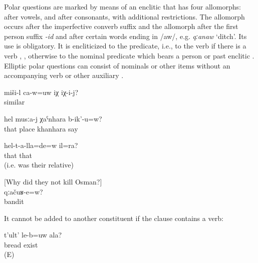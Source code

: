 Polar questions are marked by means of an enclitic that has four allomorphs:  after vowels, and  after consonants, with additional restrictions. The allomorph  occurs after the imperfective converb suffix  and the allomorph  after the first person suffix \textit{-id} and after certain words ending in /aw/, e.g. \textit{qːanaw} `ditch'. Its use is obligatory. It is encliticized to the predicate, i.e., to the verb if there is a verb , , otherwise to the nominal predicate which bears a person or past enclitic . Elliptic polar questions can consist of nominals or other items without an accompanying verb or other auxiliary . 
%
\begin{exe}
	\ex	\label{ex:Is this similar to him}
	\gll	miši-l	ca-w=uw	iχ	iχ-i-j?\\
		similar			\\
	\glt	{}

	\ex	\label{ex:Is this place called khanhara? Yes}
	\gll	hel	musːa-j	χaˁnhara	b-ik'-u=w?	\\
		that	place	khanhara	say	\\
	\glt	{}

	\ex	\label{ex:‎He also belonged to them? (i.e. was their relative)}
	\gll	hel-t-a-lla=de=w	il=ra?	\\
		that	that\\
	\glt	{} (i.e. was their relative)

	\ex	\label{ex:‎The bandits?}[Why did they not kill Osman?]\\
		\gll	qːačuʁ-e=w?	\\
			bandit	\\
		\glt	{}

\end{exe}

It cannot be added to another constituent if the clause contains a verb:
%
\begin{exe}
	\ex	\label{ex:Do you have bread}
	\begin{xlist}
		\ex	\label{ex:Do you have bread@A}
		\gll	t'ult'	le-b=uw	ala?\\
			bread	exist	\\
		\glt	{} (E)
	
		\ex	{} \label{ex:Do you have bread@B}
	\end{xlist}
\end{exe}

